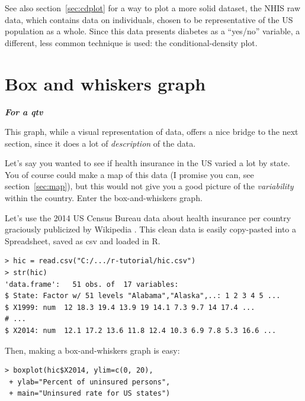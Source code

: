\documentclass{report}
\newcommand{\notefor}[1]{\hfill\textbf{\textit{#1}}}
\begin{document}
	See also section~\ref{sec:cdplot} for a way to plot a more solid dataset, the NHIS raw data, which contains data on individuals, chosen to be representative of the US population as a whole. Since this data presents diabetes as a ``yes/no'' variable, a different, less common technique is used: the conditional-density plot.
	
	\section{Box and whiskers graph}\label{sec:boxplot}
	\notefor{For a \gls{qtv}}
	
	This graph, while a visual representation of data, offers a nice bridge to the next section, since it does a lot of \emph{description} of the data.
	
	Let's say you wanted to see if health insurance in the US varied a lot by state. You of course could make a map of this data (I promise you can, see section~\ref{sec:map}), but this would not give you a good picture of the \emph{variability} within the country. Enter the box-and-whiskers graph.
	
	Let's use the 2014 US Census Bureau data about health insurance per country graciously publicized by Wikipedia \cite{hic}. This clean data is easily copy-pasted into a Spreadsheet, saved as csv and loaded in R.
	\begin{verbatim}
> hic = read.csv("C:/.../r-tutorial/hic.csv")
> str(hic)
'data.frame':   51 obs. of  17 variables:
$ State: Factor w/ 51 levels "Alabama","Alaska",..: 1 2 3 4 5 ...
$ X1999: num  12 18.3 19.4 13.9 19 14.1 7.3 9.7 14 17.4 ...
# ...
$ X2014: num  12.1 17.2 13.6 11.8 12.4 10.3 6.9 7.8 5.3 16.6 ...
	\end{verbatim}
	
	Then, making a box-and-whiskers graph is easy:
	\begin{verbatim}
> boxplot(hic$X2014, ylim=c(0, 20),
 + ylab="Percent of uninsured persons", 
 + main="Uninsured rate for US states")
	\end{verbatim}
	
\end{document}

